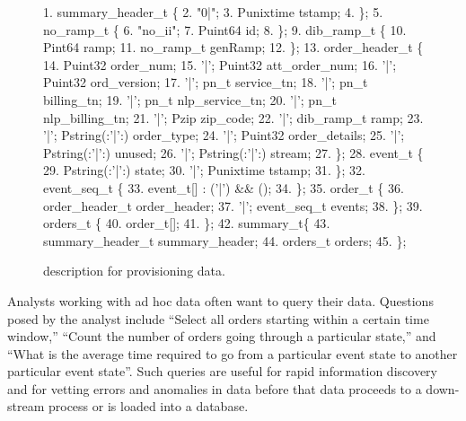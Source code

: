\begin{figure}
\begin{small}
\begin{code}
{ 1}.   summary\_header\_t \{
{ 2}.  "0|";
{ 3}.  Punixtime tstamp;
{ 4}. \};
\mbox{}
{ 5}.  no\_ramp\_t \{
{ 6}.  "no\_ii";
{ 7}.  Puint64 id;
{ 8}. \};
\mbox{}
{ 9}.  dib\_ramp\_t \{
{10}.   Pint64     ramp;
{11}.   no\_ramp\_t  genRamp;
{12}. \};
\mbox{}
{13}.  order\_header\_t \{
{14}.        Puint32             order\_num;
{15}.  '|';  Puint32             att\_order\_num;
{16}.  '|';  Puint32             ord\_version;
{17}.  '|';   pn\_t           service\_tn;
{18}.  '|';   pn\_t           billing\_tn;
{19}.  '|';   pn\_t           nlp\_service\_tn;
{20}.  '|';   pn\_t           nlp\_billing\_tn;
{21}.  '|';   Pzip           zip\_code;
{22}.  '|';  dib\_ramp\_t          ramp;
{23}.  '|';  Pstring(:'|':)      order\_type;
{24}.  '|';  Puint32             order\_details;
{25}.  '|';  Pstring(:'|':)      unused;
{26}.  '|';  Pstring(:'|':)      stream;
{27}. \};
\mbox{}
{28}.  event\_t \{
{29}.        Pstring(:'|':)    state;   
{30}.   '|'; Punixtime         tstamp;
{31}. \};
\mbox{}
{32}.  event\_seq\_t \{
{33}.   event\_t[] : ('|') && ();
{34}. \};
\mbox{}
{35}.   order\_t \{
{36}.        order\_header\_t  order\_header;
{37}.   '|'; event\_seq\_t     events;
{38}. \};
\mbox{}
{39}.  orders\_t \{
{40}.   order\_t[];
{41}. \};
\mbox{}
{42}.   summary\_t\{
{43}.   summary\_header\_t  summary\_header;
{44}.   orders\_t          orders;
{45}. \};
\end{code}
\end{small}
\caption{\pads{} description for \dibbler{} provisioning data.}
\label{figure:dibbler}
\end{figure}

Analysts working with ad hoc data often want to query their data.  
Questions posed by the \dibbler{} analyst include ``Select all
orders starting within a certain time window,'' ``Count the number of
orders going through a particular state,'' and ``What is the average
time required to go from a particular event state to another
particular event state''.  Such queries are useful for rapid
information discovery and for vetting errors and anomalies in data
before that data proceeds to a down-stream process or is loaded into a 
database.

